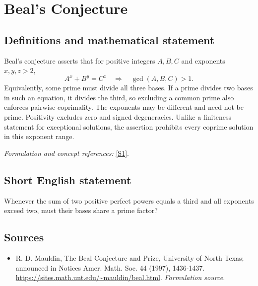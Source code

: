 \documentclass[11pt]{article}
\begin{document}
\section*{\texorpdfstring{Beal's Conjecture}{Beal's Conjecture}}\label{statement}
\subsection{Definitions and mathematical statement}
Beal's conjecture asserts that for positive integers $A,B,C$ and exponents $x,y,z>2$,
\[
 A^x+B^y=C^z\quad\Longrightarrow\quad\gcd(A,B,C)>1.
\]
Equivalently, some prime must divide all three bases. If a prime divides two bases in such an equation, it divides the third, so excluding a common prime also enforces pairwise coprimality. The exponents may be different and need not be prime. Positivity excludes zero and signed degeneracies. Unlike a finiteness statement for exceptional solutions, the assertion prohibits every coprime solution in this exponent range.
\par\smallskip\textit{Formulation and concept references:} \href{https://sites.math.unt.edu/~mauldin/beal.html}{[S1]}.

\subsection{Short English statement}
Whenever the sum of two positive perfect powers equals a third and all exponents exceed two, must their bases share a prime factor?
\subsection{Sources}
\begin{itemize}
\item[S1]R. D. Mauldin, The Beal Conjecture and Prize, University of North Texas; announced in Notices Amer. Math. Soc. 44 (1997), 1436-1437.
\url{https://sites.math.unt.edu/~mauldin/beal.html}.
\textit{Formulation source.}
\end{itemize}
\end{document}
